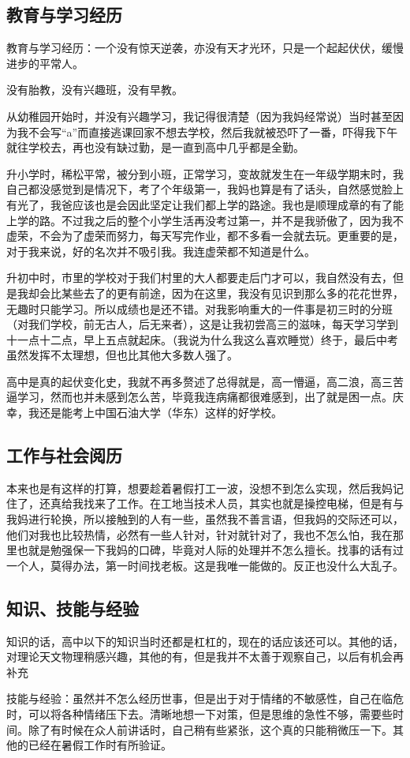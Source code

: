 \documentclass{article}
\begin{document}
\subsection{教育与学习经历}
教育与学习经历：一个没有惊天逆袭，亦没有天才光环，只是一个起起伏伏，缓慢进步的平常人。\par 
没有胎教，没有兴趣班，没有早教。\par
从幼稚园开始时，并没有兴趣学习，我记得很清楚（因为我妈经常说）当时甚至因为我不会写“a”而直接逃课回家不想去学校，然后我就被恐吓了一番，吓得我下午就往学校去，再也没有缺过勤，是一直到高中几乎都是全勤。\par 
升小学时，稀松平常，被分到小班，正常学习，变故就发生在一年级学期末时，我自己都没感觉到是情况下，考了个年级第一，我妈也算是有了话头，自然感觉脸上有光了，我爸应该也是会因此坚定让我们都上学的路途。我也是顺理成章的有了能上学的路。不过我之后的整个小学生活再没考过第一，并不是我骄傲了，因为我不虚荣，不会为了虚荣而努力，每天写完作业，都不多看一会就去玩。更重要的是，对于我来说，好的名次并不吸引我。我连虚荣都不知道是什么。\par 
升初中时，市里的学校对于我们村里的大人都要走后门才可以，我自然没有去，但是我却会比某些去了的更有前途，因为在这里，我没有见识到那么多的花花世界，无趣时只能学习。所以成绩也是还不错。对我影响重大的一件事是初三时的分班（对我们学校，前无古人，后无来者），这是让我初尝高三的滋味，每天学习学到十一点十二点，早上五点就起床。（我说为什么我这么喜欢睡觉）终于，最后中考虽然发挥不太理想，但也比其他大多数人强了。\par 
高中是真的起伏变化史，我就不再多赘述了总得就是，高一懵逼，高二浪，高三苦逼学习，然而也并未感到怎么苦，毕竟我连病痛都很难感到，出了就是困一点。庆幸，我还是能考上中国石油大学（华东）这样的好学校。\par 
\subsection{工作与社会阅历}
本来也是有这样的打算，想要趁着暑假打工一波，没想不到怎么实现，然后我妈记住了，还真给我找来了工作。在工地当技术人员，其实也就是操控电梯，但是有与我妈进行轮换，所以接触到的人有一些，虽然我不善言语，但我妈的交际还可以，他们对我也比较热情，必然有一些人针对，针对就针对了，我也不怎么怕，我在那里也就是勉强保一下我妈的口碑，毕竟对人际的处理并不怎么擅长。找事的话有过一个人，莫得办法，第一时间找老板。这是我唯一能做的。反正也没什么大乱子。\par 
\subsection{知识、技能与经验}
知识的话，高中以下的知识当时还都是杠杠的，现在的话应该还可以。其他的话，对理论天文物理稍感兴趣，其他的有，但是我并不太善于观察自己，以后有机会再补充\par 
技能与经验：虽然并不怎么经历世事，但是出于对于情绪的不敏感性，自己在临危时，可以将各种情绪压下去。清晰地想一下对策，但是思维的急性不够，需要些时间。除了有时候在众人前讲话时，自己稍有些紧张，这个真的只能稍微压一下。其他的已经在暑假工作时有所验证。\par
\end{document}
